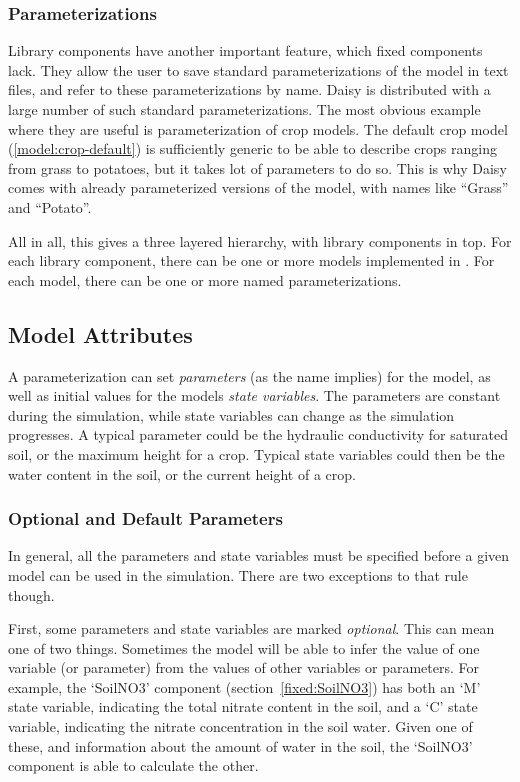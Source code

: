 \subsubsection{Parameterizations}

Library components have another important feature, which fixed
components lack.  They allow the user to save standard
parameterizations of the model in text files, and refer to these
parameterizations by name.  Daisy is distributed with a large number
of such standard parameterizations.  The most obvious example where
they are useful is parameterization of crop models.  The default crop
model (\ref{model:crop-default}) is sufficiently generic to be able to
describe crops ranging from grass to potatoes, but it takes lot of
parameters to do so.  This is why Daisy comes with already
parameterized versions of the model, with names like ``Grass'' and
``Potato''.

All in all, this gives a three layered hierarchy, with library
components in top.  For each library component, there can be one or
more models implemented in \cplusplus{}.  For each model, there can be
one or more named parameterizations.

\subsection{Model Attributes}

A parameterization can set \emph{parameters} (as the name implies) for
the model, as well as initial values for the models \emph{state
  variables}.  The parameters are constant during the simulation,
while state variables can change as the simulation progresses.  A
typical parameter could be the hydraulic conductivity for saturated
soil, or the maximum height for a crop.  Typical state variables could
then be the water content in the soil, or the current height of a
crop.

\subsubsection{Optional and Default Parameters}

In general, all the parameters and state variables must be specified
before a given model can be used in the simulation.  There are two
exceptions to that rule though.  

First, some parameters and state variables are marked \emph{optional}.
This can mean one of two things.  Sometimes the model will be able to
infer the value of one variable (or parameter) from the values of
other variables or parameters.  For example, the `SoilNO3' component
(section~\ref{fixed:SoilNO3}) has both an `M' state variable,
indicating the total nitrate content in the soil, and a `C' state
variable, indicating the nitrate concentration in the soil water.
Given one of these, and information about the amount of water in the
soil, the `SoilNO3' component is able to calculate the other.

